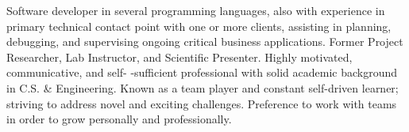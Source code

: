 

\begin{cvsummary}

Software developer in several programming languages, also with experience in primary technical contact point with one or more clients, assisting in planning, debugging, and supervising ongoing critical business applications.
Former Project Researcher, Lab Instructor, and Scientific Presenter.%
Highly motivated, communicative, and self-
-sufficient %
professional with solid academic background in C.S. \& Engineering.%
Known as a team player %
and constant self-driven learner; 
striving to address novel and exciting challenges. %
Preference to work with %
teams in order to grow personally and professionally.
\end{cvsummary}
